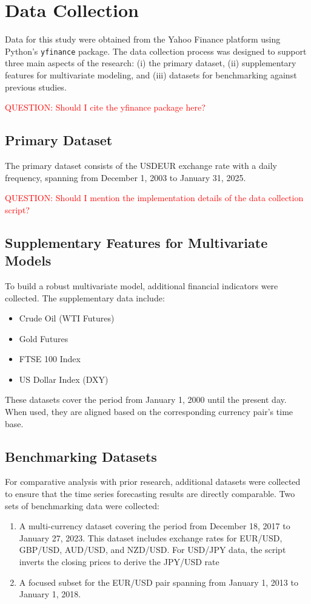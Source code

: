 \section{Data Collection}

Data for this study were obtained from the Yahoo Finance platform using Python’s \texttt{yfinance} package.
The data collection process was designed to support three main aspects of the research: (i) the primary dataset, (ii) supplementary features for multivariate modeling, and (iii) datasets for benchmarking against previous studies.

\textcolor{red}{QUESTION: Should I cite the yfinance package here?}
\subsection{Primary Dataset}
The primary dataset consists of the USDEUR exchange rate with a daily frequency, spanning from December 1, 2003 to January 31, 2025.

\textcolor{red}{QUESTION: Should I mention the implementation details of the data collection script?}


\subsection{Supplementary Features for Multivariate Models}
To build a robust multivariate model, additional financial indicators were collected.
The supplementary data include:
\begin{itemize}
    \item Crude Oil (WTI Futures)
    \item Gold Futures
    \item FTSE 100 Index
    \item US Dollar Index (DXY)
\end{itemize}
These datasets cover the period from January 1, 2000 until the present day.
When used, they are aligned based on the corresponding currency pair's time base.


\subsection{Benchmarking Datasets}
For comparative analysis with prior research, additional datasets were collected to ensure that the time series forecasting results are directly comparable. Two sets of benchmarking data were collected:
\begin{enumerate}
    \item A multi-currency dataset covering the period from December 18, 2017 to January 27, 2023. This dataset includes exchange rates for EUR/USD, GBP/USD, AUD/USD, and NZD/USD. For USD/JPY data, the script inverts the closing prices to derive the JPY/USD rate\cite{Garcia2023ComparisonRegression}
    \item A focused subset for the EUR/USD pair spanning from January 1, 2013 to January 1, 2018\cite{Yildirim2021ComparisonClassification}.
\end{enumerate}
